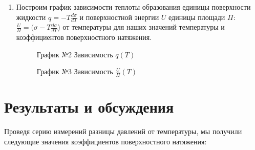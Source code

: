 \documentclass[a4paper]{article}
\begin{document}
\begin{enumerate}
\item Построим график зависимости теплоты образования единицы поверхности жидкости $q  = -T\frac{d\sigma}{dT} $  и поверхностной энергии $U$ единицы площади $\Pi$: $\frac{U}{\Pi} = (\sigma - T\frac{d\sigma}{dT}$) от температуры для наших значений температуры и коэффициентов поверхностного натяжения.\\
\begin{figure}[h!]
\caption[]{\label{} График №2 Зависимость $q(T)$}
\end{figure}

\begin{figure}[h!]
\caption[]{\label{} График №3 Зависимость $\frac{U}{\Pi}(T)$}
\end{figure}
\end{enumerate}
\clearpage
\section{Результаты и обсуждения}
Проведя серию измерений разницы давлений от температуры, мы получили следующие значения коэффициентов поверхностного натяжения:\newline
\end{document}
